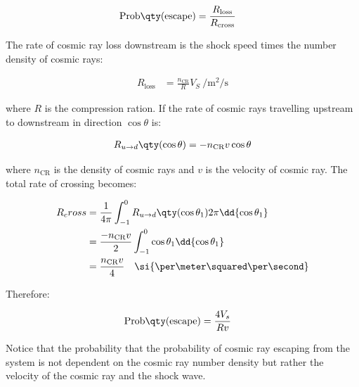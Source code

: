 \begin{equation}
    \begin{aligned}
    \text{Prob}\qty(\text{escape})&=\frac{R_\text{loss}}{R_\text{cross}}
    \end{aligned}
\end{equation}

The rate of cosmic ray loss downstream is the shock speed times the number density of cosmic rays:

\begin{equation}
    \begin{aligned}
    R_\text{loss}&=\frac{n_\text{CR}}{R} V_S~\si{\per\meter\squared\per\second}
    \end{aligned}
\end{equation}

where $R$ is the compression ration. If the rate of cosmic rays travelling upstream to downstream in direction $\cos\theta$ is:

\begin{equation}
    \begin{aligned}
    R_{u\rightarrow d}\qty(\cos\theta) = -n_\text{CR}v\cos\theta
    \end{aligned}
\end{equation}

where $n_\text{CR}$ is the density of cosmic rays and $v$ is the velocity of cosmic ray. The total rate of crossing becomes:

\begin{equation}
    \begin{aligned}
    R_cross&=\frac{1}{4\pi}\int_{-1}^0R_{u\rightarrow d}\qty(\cos\theta_1)2\pi \dd{\cos\theta_1} \\
	&=\frac{-n_\text{CR}v}{2}\int_{-1}^0\cos\theta_1\dd{\cos\theta_1} \\
	&=\frac{n_\text{CR}v}{4}\quad\si{\per\meter\squared\per\second}
    \end{aligned}
\end{equation}

Therefore:

\begin{equation}
    \begin{aligned}
    \text{Prob}\qty(\text{escape})&=\frac{4V_s}{Rv}  
    \end{aligned} \label{eq:appendix_A_prob_escape}
\end{equation}

Notice that the probability that the probability of cosmic ray escaping from the system is not dependent on the cosmic ray number density but rather the velocity of the cosmic ray and the shock wave.


